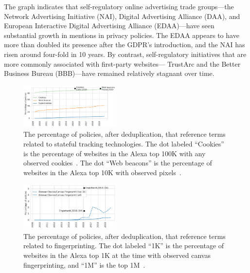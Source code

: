 The graph indicates that self-regulatory online advertising trade groups---the Network Advertising Initiative (NAI), Digital Advertising Alliance (DAA), and European Interactive Digital Advertising Alliance (EDAA)---have seen substantial growth in mentions in privacy policies. The EDAA appears to have more than doubled its presence after the GDPR's introduction, and the NAI has risen around four-fold in 10 years.
By contrast, self-regulatory initiatives that are more commonly associated with first-party websites---
TrustArc and the Better Business Bureau (BBB)---have remained relatively stagnant over time.

\begin{figure}[t]
    \centering
    \includegraphics[width=0.45\textwidth]{figures/technologies.pdf}
    \caption{The percentage of policies, after deduplication, that reference terms related to stateful tracking technologies. The dot labeled ``Cookies'' is the percentage of websites in the Alexa top 100K with any observed cookies~\cite{cahn2016empirical}. The dot ``Web beacons'' is the percentage of websites in the Alexa top 10K with observed pixels~\cite{Fouad2020missed}.}
    \label{fig:trackingtech}
\end{figure}

\begin{figure}[t]
    \centering
    \includegraphics[width=0.45\textwidth]{figures/fingerprinting.pdf}
    \caption{The percentage of policies, after deduplication, that reference terms related to fingerprinting. The dot labeled ``1K'' is the percentage of websites in the Alexa top 1K at the time with observed canvas fingerprinting, and ``1M'' is the top 1M~\cite{englehardt2016online}.}
    \label{fig:fingerprinting}
\end{figure}

